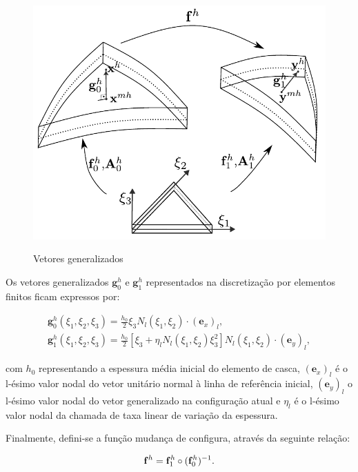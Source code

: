\begin{figure}[!htbp]
	\caption{Vetores generalizados}
	\centering
	\includegraphics[scale=0.8,trim=0cm 0.0cm 0cm 0cm, clip=true]{Imagens/Cap4/casca_vetores_generalizados.pdf}	
	\label{fig:casca_vetores_generalizados}
\end{figure}

Os vetores generalizados $\mathbf{g}^{h}_{0}$ e $\mathbf{g}^{h}_{1}$ representados na discretização por elementos finitos ficam expressos por:

\begin{align}
\mathbf{g}^{h}_{0} (\xi_{1},\xi_{2}, \xi_{3}) = \frac{h_{0}}{2}\xi_{3} N_{l}\left(\xi_{1},\xi_{2}\right) \cdot  (\mathbf{e}_x)_l, \\
\mathbf{g}^{h}_{1} (\xi_{1},\xi_{2}, \xi_{3}) = \frac{h_{0}}{2}\left[\xi_{3} + \eta_l N_l\left(\xi_{1},\xi_{2}\right)\xi_{3}^2\right]N_{l}\left(\xi_{1},\xi_{2}\right) \cdot (\mathbf{e}_y)_l,
\end{align}

\noindent com $h_{0}$ representando a espessura média inicial do elemento de casca, $(\mathbf{e}_x)_l$ é o l-ésimo valor nodal do vetor unitário normal à linha de referência inicial, $(\mathbf{e}_y)_l$ o l-ésimo valor nodal do vetor generalizado na configuração atual e $\eta_l$ é o l-ésimo valor nodal da chamada de taxa linear de variação da espessura.

Finalmente, defini-se a função mudança de configura, através da seguinte relação:

\begin{align}
	\mathbf{f}^{h} = \mathbf{f}^{h}_{1} \circ  (\mathbf{f}^{h}_{0})^{-1} \label{eq:eq_mud_conf}.
\end{align}

